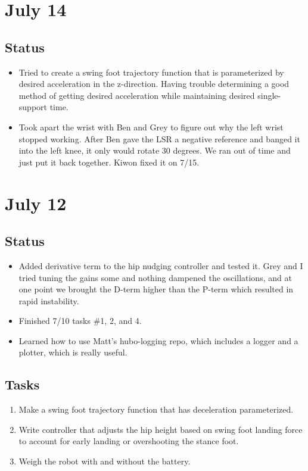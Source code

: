 \documentclass[letterpaper, 10 pt]{report}
\begin{document}
\section*{July 14}
\subsection*{Status}
\begin{itemize}
\item Tried to create a swing foot trajectory function that is parameterized by desired acceleration in the z-direction. Having trouble determining a good method of getting desired acceleration while maintaining desired single-support time.
\item Took apart the wrist with Ben and Grey to figure out why the left wrist stopped working. After Ben gave the LSR a negative reference and banged it into the left knee, it only would rotate 30 degrees. We ran out of time and just put it back together. Kiwon fixed it on 7/15.
\end{itemize}

\section*{July 12}
\subsection*{Status}
\begin{itemize}
\item Added derivative term to the hip nudging controller and tested it. Grey and I tried tuning the gains some and nothing dampened the oscillations, and at one point we brought the D-term higher than the P-term which resulted in rapid instability.
\item Finished 7/10 tasks \#1, 2, and 4.
\item Learned how to use Matt's hubo-logging repo, which includes a logger and a plotter, which is really useful.
\end{itemize}
\subsection*{Tasks}
\begin{enumerate}
\item Make a swing foot trajectory function that has deceleration parameterized.
\item Write controller that adjusts the hip height based on swing foot landing force to account for early landing or overshooting the stance foot.
\item Weigh the robot with and without the battery.
\end{enumerate}
\end{document}

